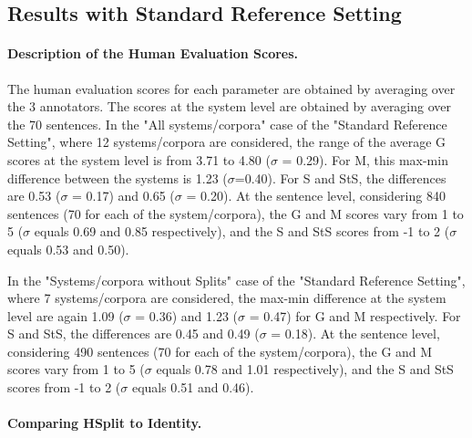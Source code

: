 \documentclass[11pt,a4paper]{article}
\begin{document}
\subsection{Results with Standard Reference Setting} \label{sec:results}

\paragraph{Description of the Human Evaluation Scores.}

The human evaluation scores for each parameter are obtained by averaging over the 3 annotators. The scores at the system level are obtained by averaging over the 70 sentences. In the "All systems/corpora" case of the "Standard Reference Setting", where 12 systems/corpora are considered, the range of the average G scores at the system level is from 3.71 to 4.80 ($\sigma$ = 0.29). For M, this max-min difference between the systems is 1.23 ($\sigma$=0.40). For S and StS, the differences are 0.53 ($\sigma$ = 0.17) and 0.65 ($\sigma$ = 0.20). At the sentence level, considering 840 sentences (70 for each of the system/corpora), the G and M scores vary from 1 to 5 ($\sigma$ equals 0.69 and 0.85 respectively), and the S and StS scores from -1 to 2 ($\sigma$ equals 0.53 and 0.50).

In the "Systems/corpora without Splits" case of the "Standard Reference Setting", where 7 systems/corpora are considered, the max-min difference at the system level are again  1.09  ($\sigma$ = 0.36) and 1.23 ($\sigma$ = 0.47) for G and M respectively. For S and StS, the differences are 0.45 and 0.49 ($\sigma$ = 0.18). At the sentence level, considering 490 sentences (70 for each of the system/corpora), the G and M scores vary from 1 to 5 ($\sigma$ equals 0.78 and 1.01 respectively), and the S and StS scores from -1 to 2 ($\sigma$ equals 0.51 and 0.46).

\paragraph{Comparing HSplit to Identity.}
\end{document}
